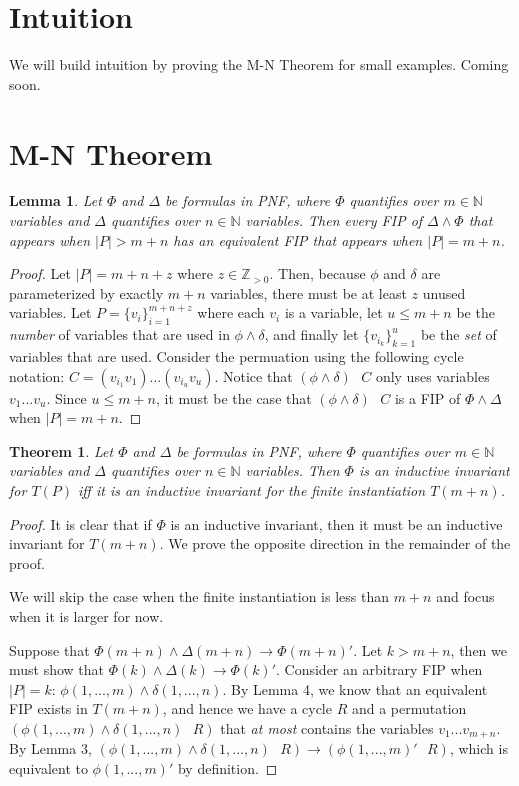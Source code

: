 \documentclass[12pt]{article}
\newtheorem{lemma}{Lemma}
\newtheorem{theorem}{Theorem}
\newcommand{\msp}{\text{ }}
\begin{document}
\section{Intuition}
We will build intuition by proving the M-N Theorem for small examples.  Coming soon.


\section{M-N Theorem}

\begin{lemma}
  Let $\Phi$ and $\Delta$ be formulas in PNF, where $\Phi$ quantifies over $m \in \mathbb{N}$ variables and $\Delta$ quantifies over $n \in \mathbb{N}$ variables.  Then every FIP of $\Delta \land \Phi$ that appears when $|P| > m+n$ has an equivalent FIP that appears when $|P| = m+n$.
\end{lemma}
\begin{proof}
  Let $|P| = m + n + z$ where $z \in \mathbb{Z}_{>0}$.  Then, because $\phi$ and $\delta$ are parameterized by exactly $m+n$ variables, there must be at least $z$ unused variables.  Let $P = \{v_i\}_{i=1}^{m+n+z}$ where each $v_i$ is a variable, let $u \leq m+n$ be the \textit{number} of variables that are used in $\phi \land \delta$, and finally let $\{v_{i_k}\}_{k=1}^{u}$ be the \textit{set} of variables that are used.  Consider the permuation using the following cycle notation: $C = (v_{i_1} v_1)...(v_{i_u} v_u)$.  Notice that $(\phi \land \delta) \msp C$ only uses variables $v_1 ... v_u$.  Since $u \leq m+n$, it must be the case that $(\phi \land \delta) \msp C$ is a FIP of $\Phi \land \Delta$ when $|P| = m+n$.
\end{proof}

\begin{theorem}
  Let $\Phi$ and $\Delta$ be formulas in PNF, where $\Phi$ quantifies over $m \in \mathbb{N}$ variables and $\Delta$ quantifies over $n \in \mathbb{N}$ variables.  Then $\Phi$ is an inductive invariant for $T(P)$ iff it is an inductive invariant for the finite instantiation $T(m+n)$.
\end{theorem}
\begin{proof}
  It is clear that if $\Phi$ is an inductive invariant, then it must be an inductive invariant for $T(m+n)$.  We prove the opposite direction in the remainder of the proof.

  We will skip the case when the finite instantiation is less than $m+n$ and focus when it is larger for now.

  Suppose that $\Phi(m+n) \land \Delta(m+n) \rightarrow \Phi(m+n)'$.  Let $k > m+n$, then we must show that $\Phi(k) \land \Delta(k) \rightarrow \Phi(k)'$.  Consider an arbitrary FIP when $|P|=k$: $\phi(1,...,m) \land \delta(1,...,n)$.  By Lemma 4, we know that an equivalent FIP exists in $T(m+n)$, and hence we have a cycle $R$ and a permutation $(\phi(1,...,m) \land \delta(1,...,n) \msp R)$ that \textit{at most} contains the variables $v_1 ... v_{m+n}$.  By Lemma 3, $(\phi(1,...,m) \land \delta(1,...,n) \msp R) \rightarrow (\phi(1,...,m)' \msp R)$, which is equivalent to $\phi(1,...,m)'$ by definition.
\end{proof}
\end{document}
